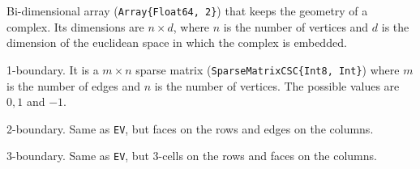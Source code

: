 \begin{description}[align=right,labelwidth=2em]
    \item [\texttt{V}:]
        Bi-dimensional array (\texttt{Array\{Float64, 2\}}) that keeps the geometry of a complex.
        Its dimensions are $n \times d$, where $n$ is the number of vertices and $d$ is the dimension
        of the euclidean space in which the complex is embedded.
    \item [\texttt{EV}:]
        1-boundary. It is a $m \times n$ sparse matrix (\texttt{SparseMatrixCSC\{Int8, Int\}}) 
        where $m$ is the number of edges and $n$ is the number of vertices. The possible values
        are $0, 1$ and $-1$.
    \item [\texttt{FE}:]
        2-boundary. Same as \texttt{EV}, but faces on the rows and edges on the columns.
    \item [\texttt{CF}:]
        3-boundary. Same as \texttt{EV}, but 3-cells on the rows and faces on the columns.
    

\end{description}